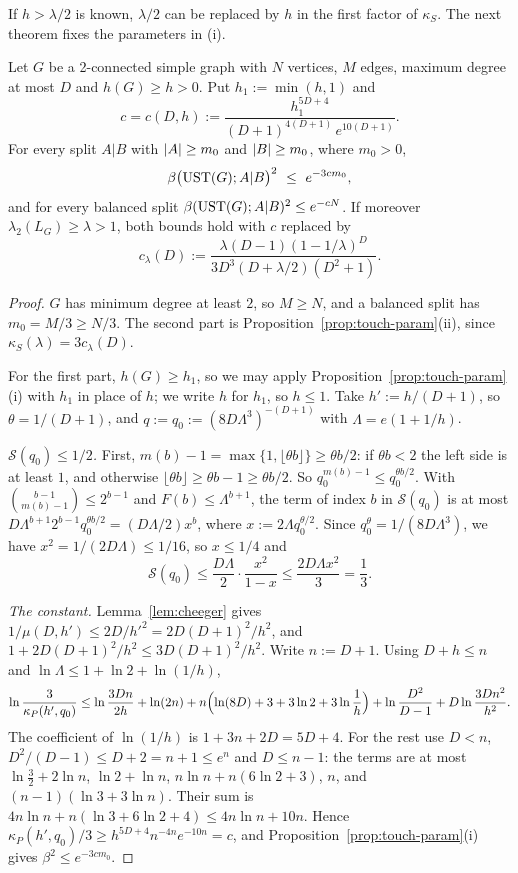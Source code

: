 If $h>\lambda/2$ is known, $\lambda/2$ can be replaced by $h$ in the first factor of $\kappa_S$. The next theorem fixes the parameters in (i).

\begin{theorem}\label{thm:touch}
Let $G$ be a 2-connected simple graph with $N$ vertices, $M$ edges, maximum degree at most $D$ and $h(G)\ge h>0$. Put $h_1:=\min(h,1)$ and
\[
  c=c(D,h):=\frac{h_1^{5D+4}}{(D+1)^{4(D+1)}\,e^{10(D+1)}} .
\]
For every split $A|B$ with $\lvert A\rvert\ge m_0$ and $\lvert B\rvert\ge m_0$, where $m_0>0$,
\[
  \beta\bigl(\UST(G);A|B\bigr)^2\ \le\ e^{-3cm_0},
\]
and for every balanced split $\beta(\mathrm{UST}(G);A|B)^2\le e^{-cN}$. If moreover $\lambda_2(L_G)\ge\lambda>1$, both bounds hold with $c$ replaced by
\[
  c_\lambda(D):=\frac{\lambda(D-1)(1-1/\lambda)^D}{3D^3(D+\lambda/2)(D^2+1)} .
\]
\end{theorem}

\begin{proof}
$G$ has minimum degree at least $2$, so $M\ge N$, and a balanced split has $m_0=M/3\ge N/3$. The second part is Proposition~\ref{prop:touch-param}(ii), since $\kappa_S(\lambda)=3c_\lambda(D)$.

For the first part, $h(G)\ge h_1$, so we may apply Proposition~\ref{prop:touch-param}(i) with $h_1$ in place of $h$; we write $h$ for $h_1$, so $h\le1$. Take $h':=h/(D+1)$, so $\theta=1/(D+1)$, and $q:=q_0:=(8D\Lambda^3)^{-(D+1)}$ with $\Lambda=e(1+1/h)$.

\emph{$\mathcal S(q_0)\le1/2$.} First, $m(b)-1=\max\{1,\lfloor\theta b\rfloor\}\ge\theta b/2$: if $\theta b<2$ the left side is at least $1$, and otherwise $\lfloor\theta b\rfloor\ge\theta b-1\ge\theta b/2$. So $q_0^{m(b)-1}\le q_0^{\theta b/2}$. With $\binom{b-1}{m(b)-1}\le2^{b-1}$ and $F(b)\le\Lambda^{b+1}$, the term of index $b$ in $\mathcal S(q_0)$ is at most $D\Lambda^{b+1}2^{b-1}q_0^{\theta b/2}=(D\Lambda/2)x^b$, where $x:=2\Lambda q_0^{\theta/2}$. Since $q_0^\theta=1/(8D\Lambda^3)$, we have $x^2=1/(2D\Lambda)\le1/16$, so $x\le1/4$ and
\[
  \mathcal S(q_0)\le\frac{D\Lambda}2\cdot\frac{x^2}{1-x}\le\frac{2D\Lambda x^2}3=\frac13 .
\]

\emph{The constant.} Lemma~\ref{lem:cheeger} gives $1/\mu(D,h')\le2D/h'^2=2D(D+1)^2/h^2$, and $1+2D(D+1)^2/h^2\le3D(D+1)^2/h^2$. Write $n:=D+1$. Using $D+h\le n$ and $\ln\Lambda\le1+\ln2+\ln(1/h)$,
\[
  \ln\frac3{\kappa_P(h',q_0)}\le\ln\frac{3Dn}{2h}+\ln(2n)+n\Bigl(\ln(8D)+3+3\ln2+3\ln\frac1h\Bigr)+\ln\frac{D^2}{D-1}+D\ln\frac{3Dn^2}{h^2}.
\]
The coefficient of $\ln(1/h)$ is $1+3n+2D=5D+4$. For the rest use $D<n$, $D^2/(D-1)\le D+2=n+1\le e^n$ and $D\le n-1$: the terms are at most $\ln\frac32+2\ln n$, $\ln2+\ln n$, $n\ln n+n(6\ln2+3)$, $n$, and $(n-1)(\ln3+3\ln n)$. Their sum is $4n\ln n+n(\ln3+6\ln2+4)\le4n\ln n+10n$. Hence $\kappa_P(h',q_0)/3\ge h^{5D+4}n^{-4n}e^{-10n}=c$, and Proposition~\ref{prop:touch-param}(i) gives $\beta^2\le e^{-3cm_0}$.
\end{proof}

